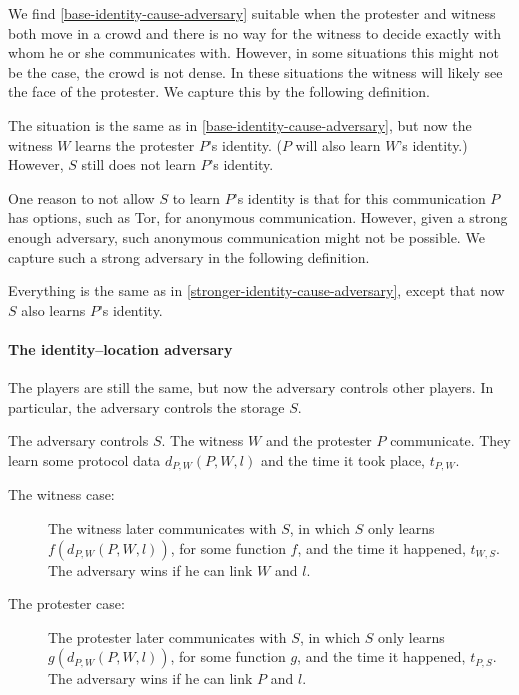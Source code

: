 We find \cref{base-identity-cause-adversary} suitable when the protester and witness both move in a crowd and there is no way for the witness to decide exactly with whom he or she communicates with.
However, in some situations this might not be the case, \eg the crowd is not dense.
In these situations the witness will likely see the face of the protester.
We capture this by the following definition.

\begin{definition}%
  \label{stronger-identity-cause-adversary}
  The situation is the same as in \cref{base-identity-cause-adversary}, but now the 
  witness \(W\) learns the protester \(P\)'s identity.
  (\(P\) will also learn \(W\)'s identity.)
  However, \(S\) still does not learn \(P\)'s identity.
\end{definition}

One reason to not allow \(S\) to learn \(P\)'s identity is that for this communication \(P\) has options, such as \ac{Tor}, for anonymous communication.
However, given a strong enough adversary, such anonymous communication might not be possible.
We capture such a strong adversary in the following definition.

\begin{definition}%
  \label{strongest-identity-cause-adversary}
  Everything is the same as in \cref{stronger-identity-cause-adversary}, except that now \(S\) also learns \(P\)'s identity.
\end{definition}

\paragraph{The identity--location adversary}

The players are still the same, but now the adversary controls other players.
In particular, the adversary controls the storage \(S\).

\begin{definition}%
  \label{base-identity-location-adversary}
  The adversary controls \(S\).
  The witness \(W\) and the protester \(P\) communicate.
  They learn some protocol data \(d_{P,W}(P, W, l)\) and the time it took 
  place, \(t_{P,W}\).
  \begin{description}
    \item[The witness case:]
      The witness later communicates with \(S\), in which \(S\) only learns 
      \(f(d_{P,W}(P, W, l))\), for some function \(f\), and the time it 
      happened, \(t_{W,S}\).
      The adversary wins if he can link \(W\) and \(l\).
    \item[The protester case:]
      The protester later communicates with \(S\), in which \(S\) only learns 
      \(g(d_{P,W}(P, W, l))\), for some function \(g\), and the time it 
      happened, \(t_{P,S}\).
      The adversary wins if he can link \(P\) and \(l\).
  \end{description}
\end{definition}


